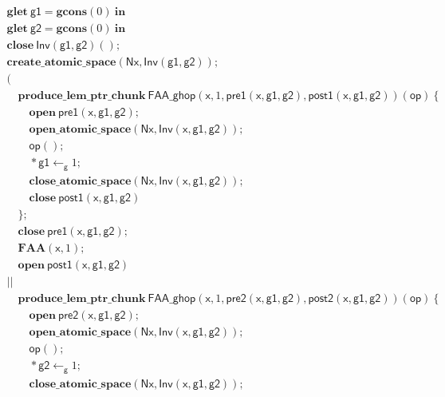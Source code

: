 \documentclass{article}
\begin{document}
\begin{figure}
$$\begin{array}{l}
\mathbf{glet}\ \mathsf{g1} = \mathbf{gcons}(0)\ \mathbf{in}\\
\mathbf{glet}\ \mathsf{g2} = \mathbf{gcons}(0)\ \mathbf{in}\\
\mathbf{close}\ \mathsf{Inv}(\mathsf{g1}, \mathsf{g2})();\\
\mathbf{create\_atomic\_space}(\mathsf{Nx}, \mathsf{Inv}(\mathsf{g1}, \mathsf{g2}));\\
(\\
\quad \mathbf{produce\_lem\_ptr\_chunk}\ \mathsf{FAA\_ghop}(\mathsf{x}, 1, \mathsf{pre1}(\mathsf{x}, \mathsf{g1}, \mathsf{g2}), \mathsf{post1}(\mathsf{x}, \mathsf{g1}, \mathsf{g2}))(\mathsf{op})\ \{\\
\quad\quad \mathbf{open}\ \mathsf{pre1}(\mathsf{x}, \mathsf{g1}, \mathsf{g2});\\
\quad\quad \mathbf{open\_atomic\_space}(\mathsf{Nx}, \mathsf{Inv}(\mathsf{x}, \mathsf{g1}, \mathsf{g2}));\\
\quad\quad \mathsf{op}();\\
\quad\quad *\mathsf{g1} \leftarrow_\mathsf{g} 1;\\
\quad\quad \mathbf{close\_atomic\_space}(\mathsf{Nx}, \mathsf{Inv}(\mathsf{x}, \mathsf{g1}, \mathsf{g2}));\\
\quad\quad \mathbf{close}\ \mathsf{post1}(\mathsf{x}, \mathsf{g1}, \mathsf{g2})\\
\quad \};\\
\quad \mathbf{close}\ \mathsf{pre1}(\mathsf{x}, \mathsf{g1}, \mathsf{g2});\\
\quad \mathbf{FAA}(\mathsf{x}, 1);\\
\quad \mathbf{open}\ \mathsf{post1}(\mathsf{x}, \mathsf{g1}, \mathsf{g2})\\
||\\
\quad \mathbf{produce\_lem\_ptr\_chunk}\ \mathsf{FAA\_ghop}(\mathsf{x}, 1, \mathsf{pre2}(\mathsf{x}, \mathsf{g1}, \mathsf{g2}), \mathsf{post2}(\mathsf{x}, \mathsf{g1}, \mathsf{g2}))(\mathsf{op})\ \{\\
\quad\quad \mathbf{open}\ \mathsf{pre2}(\mathsf{x}, \mathsf{g1}, \mathsf{g2});\\
\quad\quad \mathbf{open\_atomic\_space}(\mathsf{Nx}, \mathsf{Inv}(\mathsf{x}, \mathsf{g1}, \mathsf{g2}));\\
\quad\quad \mathsf{op}();\\
\quad\quad *\mathsf{g2} \leftarrow_\mathsf{g} 1;\\
\quad\quad \mathbf{close\_atomic\_space}(\mathsf{Nx}, \mathsf{Inv}(\mathsf{x}, \mathsf{g1}, \mathsf{g2}));\\

\end{array}$$
\end{figure}
\end{document}
